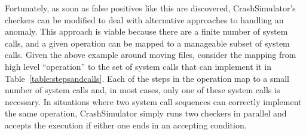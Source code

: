 Fortunately, as soon as false positives like this are discovered,
CrashSimulator's checkers can be modified to deal with alternative
approaches to handling an anomaly.  This approach is viable because there
are a finite number of system calls, and a given operation can be mapped to
a manageable subset of system calls.  Given the above example around moving
files, consider the mapping from high level ``operation'' to the set of
system calls that can implement it in Table~\ref{table:stepsandcalls}.
Each of the steps in the operation map to a small number of system calls
and, in most cases, only one of these system calls is necessary.  In
situations where two system call sequences can correctly implement the same
operation, CrashSimulator simply runs two checkers in parallel and accepts
the execution if either one ends in an accepting condition.

